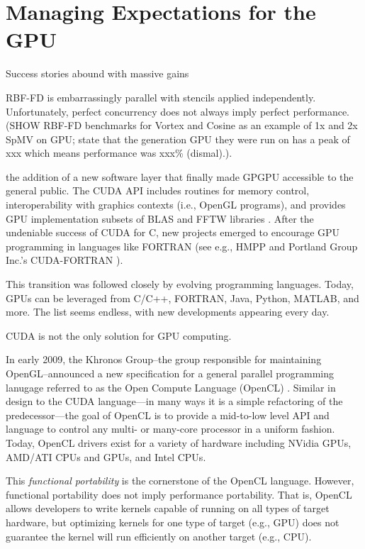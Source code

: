 \documentclass{report}
\begin{document}
\section{Managing Expectations for the GPU}
Success stories abound with massive gains

RBF-FD is embarrassingly parallel with stencils applied independently. Unfortunately, perfect concurrency does not always imply perfect performance. (SHOW RBF-FD benchmarks for Vortex and Cosine as an example of 1x and 2x SpMV on GPU; state that the generation GPU they were run on has a peak of xxx which means performance was xxx\% (dismal).).

the addition of a new software layer that finally made GPGPU accessible to the general public. The CUDA API includes routines for memory control, interoperability with graphics contexts (i.e., 
OpenGL programs), and provides GPU implementation subsets of BLAS and FFTW libraries \cite{CudaGuide2013}. After the undeniable success of CUDA for C, new projects emerged to encourage GPU programming in languages like FORTRAN (see e.g., HMPP \cite{HMPP2009} and Portland Group Inc.'s CUDA-FORTRAN \cite{CudaFortran2009}). 

This transition was 
followed closely by evolving programming languages. Today, GPUs can be leveraged from C/C++, FORTRAN, Java, Python, MATLAB, and more. The list seems endless, with new developments appearing every day. 




CUDA is not the only solution for GPU computing. 


In early 2009, the Khronos Group--the group responsible for maintaining OpenGL--announced a new specification for a general 
parallel programming lanugage referred to as the Open Compute Language (OpenCL) \cite{OpenCL2009}. Similar in design to the CUDA language---in many ways it is a simple refactoring of the predecessor---the goal of OpenCL is to provide a mid-to-low level API and language to control any multi- or many-core processor in a uniform fashion. Today, OpenCL drivers exist for a variety of hardware including NVidia GPUs, AMD/ATI CPUs and GPUs, and Intel CPUs. 

This \textit{functional portability} is the cornerstone of the OpenCL language. However, functional portability does not imply performance portability. That is, OpenCL allows developers to write kernels capable of running on all types of target hardware, but optimizing kernels for one type of target (e.g., GPU) does not guarantee the kernel will run efficiently on another target (e.g., CPU).
\end{document}
